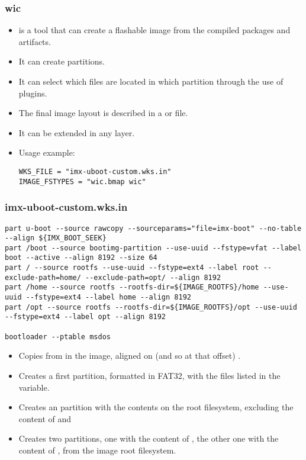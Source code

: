 \begin{frame}[fragile]
  \frametitle{wic}
  \begin{itemize}
    \item {} is a tool that can create a flashable image from
      the compiled packages and artifacts.
    \item It can create partitions.
    \item It can select which files are located in
      which partition through the use of plugins.
    \item The final image layout is described in a  or
       file.
    \item It can be extended in any layer.
    \item Usage example:
      \begin{block}{}
        \begin{verbatim}
WKS_FILE = "imx-uboot-custom.wks.in"
IMAGE_FSTYPES = "wic.bmap wic"
        \end{verbatim}
      \end{block}
  \end{itemize}
\end{frame}

\begin{frame}[fragile]
  \frametitle{imx-uboot-custom.wks.in}
      \begin{block}{}
        \fontsize{7}{7}\selectfont
        \begin{verbatim}
part u-boot --source rawcopy --sourceparams="file=imx-boot" --no-table --align ${IMX_BOOT_SEEK}
part /boot --source bootimg-partition --use-uuid --fstype=vfat --label boot --active --align 8192 --size 64
part / --source rootfs --use-uuid --fstype=ext4 --label root --exclude-path=home/ --exclude-path=opt/ --align 8192
part /home --source rootfs --rootfs-dir=${IMAGE_ROOTFS}/home --use-uuid --fstype=ext4 --label home --align 8192
part /opt --source rootfs --rootfs-dir=${IMAGE_ROOTFS}/opt --use-uuid --fstype=ext4 --label opt --align 8192

bootloader --ptable msdos
        \end{verbatim}
      \end{block}
  \begin{itemize}
  \item Copies  from  in the image,
    aligned on (and so at that offset) .
  \item Creates a first partition, formatted in FAT32, with the files
    listed in the  variable.
  \item Creates an  partition with the contents on the root
    filesystem, excluding the content of  and 
  \item Creates two  partitions, one with the content of
    , the other one with the content of , from
    the image root filesystem.
  \end{itemize}
\end{frame}

